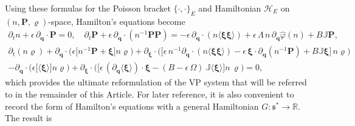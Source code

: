 \documentclass[%
 aip,
 amsmath,amssymb,
reprint, onecolumn %
]{revtex4-1}
\begin{document}
Using these formulas for the Poisson bracket $\{\cdot,\cdot\}_E$ and Hamiltonian $\mathcal{H}_E$ on $(n,\bm{P},\varrho)$-space, Hamilton's equations become
\begin{gather}
\partial_tn + \epsilon\,\partial_{\bm{q}}\cdot\bm{P}  = 0,\quad \partial_t\bm{P} + \epsilon\,\partial_{\bm{q}}\cdot(n^{-1}\bm{P}\bm{P}) = - \epsilon\,\partial_{\bm{q}}\cdot(n\langle \bm{\xi}\bm{\xi}\rangle) + \epsilon\,\Lambda\,n\,\partial_{\bm{q}}\widehat{\varphi}(n) + B\mathbb{J}\bm{P},\label{fs_fluid}\\
\partial_t(n\varrho) + \partial_{\bm{q}}\cdot\bigg(\epsilon\bigg[n^{-1}\bm{P} + \bm{\xi}\bigg]n\varrho\bigg) + \partial_{\bm{\xi}}\cdot\bigg(\bigg[\epsilon\,n^{-1}\partial_{\bm{q}}\cdot(n\langle \bm{\xi}\bm{\xi}\rangle) - \epsilon\,\bm{\xi}\cdot\partial_{\bm{q}}(n^{-1}\bm{P}) + B\mathbb{J}\bm{\xi}\bigg]\,n\varrho\bigg)\nonumber\\
 - \partial_{\bm{q}}\cdot\bigg(\epsilon\bigg[\langle \bm{\xi}\rangle\bigg]n\varrho\bigg) + \partial_{\bm{\xi}}\cdot\bigg(\bigg[\epsilon\,(\partial_{\bm{q}}\langle\bm{\xi}\rangle)\cdot\bm{\xi} - (B-\epsilon\,\Omega)\,\mathbb{J}\langle\bm{\xi}\rangle\bigg]n\,\varrho\bigg) = 0,\label{fs_kinetic}
\end{gather}
which provides the ultimate reformulation of the VP system that will be referred to in the remainder of this Article. For later reference, it is also convenient to record the form of Hamilton's equations with a general Hamiltonian $G:\mathfrak{s}^*\rightarrow\mathbb{R}$. The result is
\end{document}
